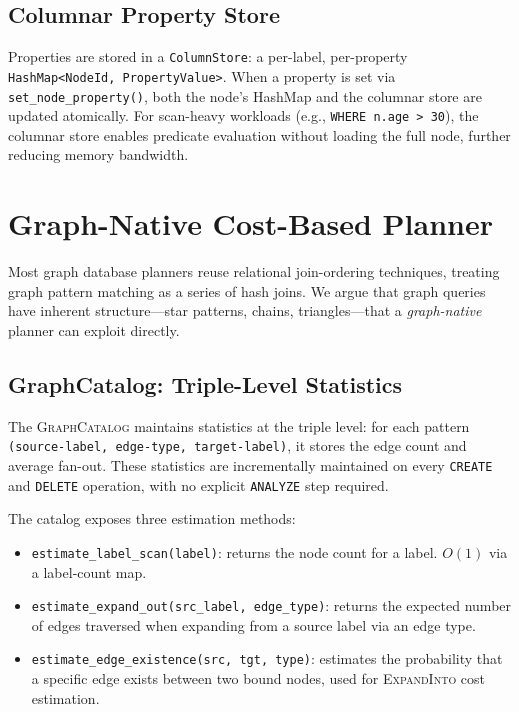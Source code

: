 \documentclass[sigconf, nonacm]{acmart}
\begin{document}
\subsection{Columnar Property Store}

Properties are stored in a \texttt{ColumnStore}: a per-label, per-property \texttt{HashMap<NodeId, PropertyValue>}.
When a property is set via \texttt{set\_node\_property()}, both the node's HashMap and the columnar store are updated atomically.
For scan-heavy workloads (e.g., \texttt{WHERE n.age > 30}), the columnar store enables predicate evaluation without loading the full node, further reducing memory bandwidth.

\section{Graph-Native Cost-Based Planner}
\label{sec:planner}

Most graph database planners reuse relational join-ordering techniques, treating graph pattern matching as a series of hash joins.
We argue that graph queries have inherent structure---star patterns, chains, triangles---that a \emph{graph-native} planner can exploit directly.

\subsection{GraphCatalog: Triple-Level Statistics}
\label{sec:catalog}

The \textsc{GraphCatalog} maintains statistics at the triple level: for each pattern \texttt{(source-label, edge-type, target-label)}, it stores the edge count and average fan-out.
These statistics are incrementally maintained on every \texttt{CREATE} and \texttt{DELETE} operation, with no explicit \texttt{ANALYZE} step required.

The catalog exposes three estimation methods:

\begin{itemize}[leftmargin=*]
  \item \texttt{estimate\_label\_scan(label)}: returns the node count for a label. $O(1)$ via a label-count map.
  \item \texttt{estimate\_expand\_out(src\_label, edge\_type)}: returns the expected number of edges traversed when expanding from a source label via an edge type.
  \item \texttt{estimate\_edge\_existence(src, tgt, type)}: estimates the probability that a specific edge exists between two bound nodes, used for \textsc{ExpandInto} cost estimation.
\end{itemize}
\end{document}
